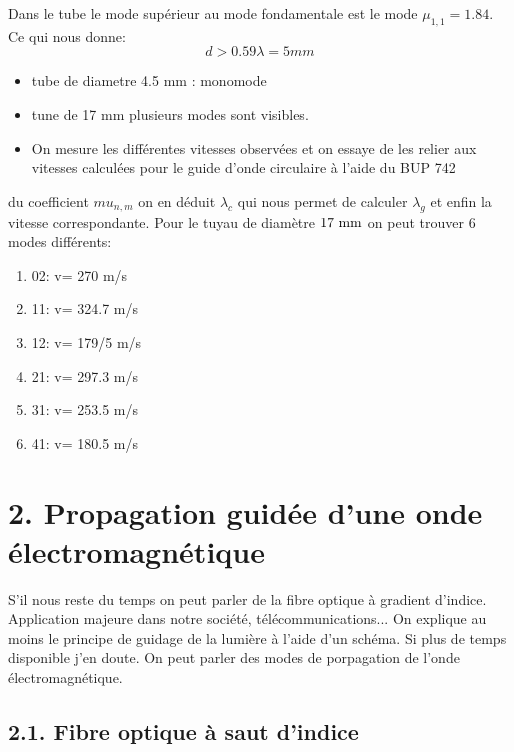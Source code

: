 \documentclass[french, a4paper, 10pt, twocolumn, landscape]{article}
\begin{document}
Dans le tube le mode supérieur au mode fondamentale est le mode $\mu_{1,1}=1.84$. Ce qui nous donne:
\begin{equation}
	d>0.59\lambda = 5mm
\end{equation} 


\begin{itemize}
	\item tube de diametre 4.5 mm : monomode
	\item tune de 17 mm plusieurs modes sont visibles.
	\item On mesure les différentes vitesses observées et on essaye de les relier aux vitesses calculées pour le guide d'onde circulaire à l'aide du BUP 742
\end{itemize}


du coefficient $mu_{n,m}$ on en déduit $\lambda_c$ qui nous permet de calculer $\lambda_g$ et enfin la vitesse correspondante. Pour le tuyau de diamètre $17~\rm mm$ on peut trouver 6 modes différents:
\begin{enumerate}
	\item 02: v= 270 m/s
	\item 11: v= 324.7 m/s
	\item 12: v= 179/5 m/s
	\item 21: v= 297.3 m/s
	\item 31: v= 253.5 m/s
	\item 41: v= 180.5 m/s
\end{enumerate}


\section*{2. Propagation guidée d'une onde électromagnétique}

S'il nous reste du temps on peut parler de la fibre optique à gradient d'indice. Application majeure dans notre société, télécommunications... On explique au moins le principe de guidage de la lumière à l'aide d'un schéma. Si plus de temps disponible j'en doute. On peut parler des modes de porpagation de l'onde électromagnétique.

\subsection*{2.1. Fibre optique à saut d'indice}
\end{document}
